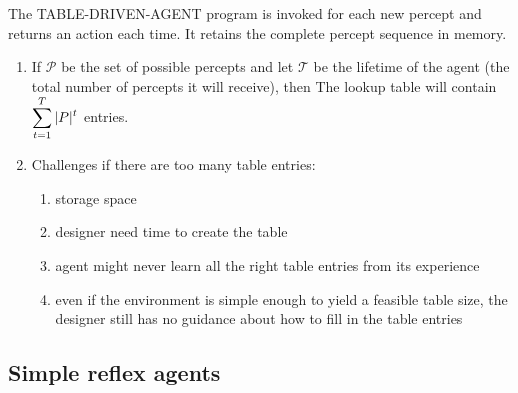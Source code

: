 \begin{algorithm}[H]
    \caption{The TABLE-DRIVEN-AGENT program is invoked for each new percept and returns an action each time. It retains the complete percept sequence in memory. \cite{aci-1}}

\end{algorithm}

\vspace{0.3cm}

\begin{enumerate}
    \item If $\mathcal{P}$ be the set of possible percepts and let $\mathcal{T}$ be the lifetime of the agent (the total number of percepts it will receive), then The lookup table will contain $\displaystyle\sum^T_{t=1} |P| ^t$ entries.

    \item Challenges if there are too many table entries:
    \begin{enumerate}
        \item storage space
        \item designer need time to create the table
        \item agent might never learn all the right table entries from its experience
        \item even if the environment is simple enough to yield a feasible table size, the designer still has no guidance about how to fill in the table entries
    \end{enumerate}

\end{enumerate}

\subsection{Simple reflex agents \cite{aci-1}}

